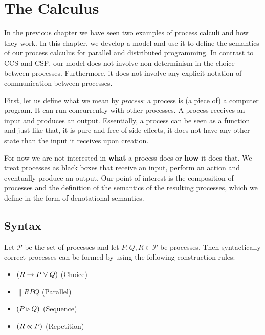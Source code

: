\chapter{The Calculus}
\label{chp:algebraic_model}
In the previous chapter we have seen two examples of process calculi and how they work. In this chapter, we develop a model and use it to define the semantics of our process calculus for parallel and distributed programming. In contrast to \textsc{CCS} and \textsc{CSP}, our model does not involve non-determinism in the choice between processes. Furthermore, it does not involve any explicit notation of communication between processes.

First, let us define what we mean by \textit{process}: a process is (a piece of) a computer program. It can run concurrently with other processes. A process receives an input and produces an output. Essentially, a process can be seen as a function and just like that, it is pure and free of side-effects, it does not have any other state than the input it receives upon creation.

For now we are not interested in \textbf{what} a process does or \textbf{how} it does that. We treat processes as black boxes that receive an input, perform an action and eventually produce an output. Our point of interest is the composition of processes and the definition of the semantics of the resulting processes, which we define in the form of denotational semantics.

\section{Syntax}
\label{chp:syntax}
Let $\mathcal{P}$ be the set of processes and let $P, Q, R \in \mathcal{P}$ be processes. Then syntactically correct processes can be formed by using the following construction rules:
\begin{itemize}
  \item $\left( R \to P \vee Q \right)$ \hspace*{2.3em} (Choice)
  \item $\parallel{R}{P}{Q}$ \hspace*{2.8em} (Parallel)
  \item $\left( P \triangleright Q \right)$ \hspace*{4.8em} (Sequence)
  \item $\left( R \propto P \right)$ \hspace*{4.4em} (Repetition)
\end{itemize}

